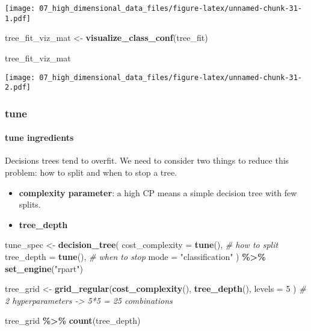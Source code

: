 \documentclass[
]{book}
\newenvironment{Shaded}{\begin{snugshade}}{\end{snugshade}}
\newcommand{\CommentTok}[1]{\textcolor[rgb]{0.56,0.35,0.01}{\textit{#1}}}
\newcommand{\DataTypeTok}[1]{\textcolor[rgb]{0.13,0.29,0.53}{#1}}
\newcommand{\DecValTok}[1]{\textcolor[rgb]{0.00,0.00,0.81}{#1}}
\newcommand{\KeywordTok}[1]{\textcolor[rgb]{0.13,0.29,0.53}{\textbf{#1}}}
\newcommand{\NormalTok}[1]{#1}
\newcommand{\OperatorTok}[1]{\textcolor[rgb]{0.81,0.36,0.00}{\textbf{#1}}}
\newcommand{\StringTok}[1]{\textcolor[rgb]{0.31,0.60,0.02}{#1}}
\begin{document}
\texttt{[image: 07\_high\_dimensional\_data\_files/figure-latex/unnamed-chunk-31-1.pdf]}

\begin{Shaded}
\begin{Highlighting}[]
\NormalTok{tree\_fit\_viz\_mat \textless{}{-}}\StringTok{ }\KeywordTok{visualize\_class\_conf}\NormalTok{(tree\_fit)}

\NormalTok{tree\_fit\_viz\_mat}
\end{Highlighting}
\end{Shaded}

\texttt{[image: 07\_high\_dimensional\_data\_files/figure-latex/unnamed-chunk-31-2.pdf]}

\hypertarget{tune-1}{%
\subsubsection{tune}\label{tune-1}}

\hypertarget{tune-ingredients-1}{%
\paragraph{tune ingredients}\label{tune-ingredients-1}}

Decisions trees tend to overfit. We need to consider two things to reduce this problem: how to split and when to stop a tree.

\begin{itemize}
\item
  \textbf{complexity parameter}: a high CP means a simple decision tree with few splits.
\item
  \textbf{tree\_depth}
\end{itemize}

\begin{Shaded}
\begin{Highlighting}[]
\NormalTok{tune\_spec \textless{}{-}}\StringTok{ }\KeywordTok{decision\_tree}\NormalTok{(}
  \DataTypeTok{cost\_complexity =} \KeywordTok{tune}\NormalTok{(), }\CommentTok{\# how to split}
  \DataTypeTok{tree\_depth =} \KeywordTok{tune}\NormalTok{(), }\CommentTok{\# when to stop}
  \DataTypeTok{mode =} \StringTok{"classification"}
\NormalTok{) }\OperatorTok{\%\textgreater{}\%}
\StringTok{  }\KeywordTok{set\_engine}\NormalTok{(}\StringTok{"rpart"}\NormalTok{)}

\NormalTok{tree\_grid \textless{}{-}}\StringTok{ }\KeywordTok{grid\_regular}\NormalTok{(}\KeywordTok{cost\_complexity}\NormalTok{(),}
  \KeywordTok{tree\_depth}\NormalTok{(),}
  \DataTypeTok{levels =} \DecValTok{5}
\NormalTok{) }\CommentTok{\# 2 hyperparameters {-}\textgreater{} 5*5 = 25 combinations}

\NormalTok{tree\_grid }\OperatorTok{\%\textgreater{}\%}
\StringTok{  }\KeywordTok{count}\NormalTok{(tree\_depth)}
\end{Highlighting}
\end{Shaded}
\end{document}
